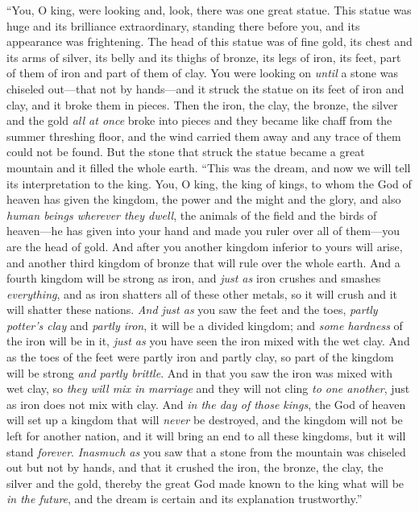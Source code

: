 \begin{biblechapter}
\verse “You, O king, were looking and, look, there was one great statue. This statue was huge and its brilliance extraordinary, standing there before you, and its appearance was frightening.
\verse The head of this statue was of fine gold, its chest and its arms of silver, its belly and its thighs of bronze,
\verse its legs of iron, its feet, part of them of iron and part of them of clay.
\verse You were looking on \textit{until} a stone was chiseled out—that not by hands—and it struck the statue on its feet of iron and clay, and it broke them in pieces.
\verse Then the iron, the clay, the bronze, the silver and the gold \textit{all at once} broke into pieces and they became like chaff from the summer threshing floor, and the wind carried them away and any trace of them could not be found. But the stone that struck the statue became a great mountain and it filled the whole earth.
\verse “This was the dream, and now we will tell its interpretation to the king.
\verse You, O king, the king of kings, to whom the God of heaven has given the kingdom, the power and the might and the glory,
\verse and also \textit{human beings wherever they dwell}, the animals of the field and the birds of heaven—he has given into your hand and made you ruler over all of them—you are the head of gold.
\verse And after you another kingdom inferior to yours will arise, and another third kingdom of bronze that will rule over the whole earth.
\verse And a fourth kingdom will be strong as iron, and \textit{just as} iron crushes and smashes \textit{everything}, and as iron shatters all of these other metals, so it will crush and it will shatter these nations.
\verse \textit{And just as} you saw the feet and the toes, \textit{partly potter’s clay} and \textit{partly iron}, it will be a divided kingdom; and \textit{some hardness} of the iron will be in it, \textit{just as} you have seen the iron mixed with the wet clay.
\verse And as the toes of the feet were partly iron and partly clay, so part of the kingdom will be strong \textit{and partly brittle}.
\verse And in that you saw the iron was mixed with wet clay, so \textit{they will mix in marriage} and they will not cling \textit{to one another}, just as iron does not mix with clay.
\verse And \textit{in the day of those kings}, the God of heaven will set up a kingdom that will \textit{never} be destroyed, and the kingdom will not be left for another nation, and it will bring an end to all these kingdoms, but it will stand \textit{forever}.
\verse \textit{Inasmuch as} you saw that a stone from the mountain was chiseled out but not by hands, and that it crushed the iron, the bronze, the clay, the silver and the gold, thereby the great God made known to the king what will be \textit{in the future}, and the dream is certain and its explanation trustworthy.”

\end{biblechapter}
